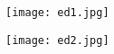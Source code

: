 \newpage %
    \thispagestyle{empty} %
    \noindent %
    \texttt{[image: ed1.jpg]} %
    \restoregeometry %
	
\newpage %
    \thispagestyle{empty} %
    \noindent %
    \texttt{[image: ed2.jpg]} %
    \restoregeometry %